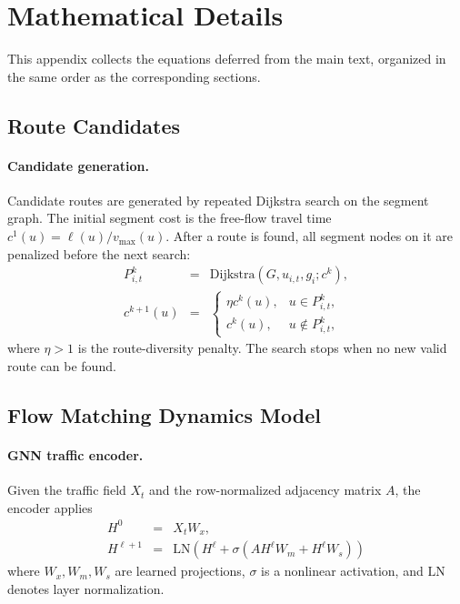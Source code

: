 \section{Mathematical Details}
\label{app:math-details}

This appendix collects the equations deferred from the main text, organized
in the same order as the corresponding sections.

\subsection{Route Candidates}

\paragraph{Candidate generation.}  Candidate routes are generated by
repeated Dijkstra search on the segment graph.  The initial segment cost is
the free-flow travel time \(c^1(u)=\ell(u)/v_{\max}(u)\).  After a route is
found, all segment nodes on it are penalized before the next search:
\begin{equation}
\begin{array}{rcl}
P^k_{i,t}
&=&
\mathrm{Dijkstra}(G,u_{i,t},g_i;c^k),\\
c^{k+1}(u)
&=&
\left\{
\begin{array}{ll}
\eta c^k(u), & u\in P^k_{i,t},\\
c^k(u), & u\notin P^k_{i,t},
\end{array}
\right.
\end{array}
\end{equation}
where \(\eta>1\) is the route-diversity penalty.  The search stops when no
new valid route can be found.

\subsection{Flow Matching Dynamics Model}

\paragraph{GNN traffic encoder.}  Given the traffic field \(X_t\) and the
row-normalized adjacency matrix \(A\), the encoder applies
\begin{equation}
\begin{array}{rcl}
H^0 &=& X_tW_x,\\
H^{\ell+1} &=&
\mathrm{LN}\!\left(
H^\ell+\sigma(AH^\ell W_m+H^\ell W_s)
\right)
\end{array}
\end{equation}
where \(W_x,W_m,W_s\) are learned projections, \(\sigma\) is a nonlinear
activation, and \(\mathrm{LN}\) denotes layer normalization.

